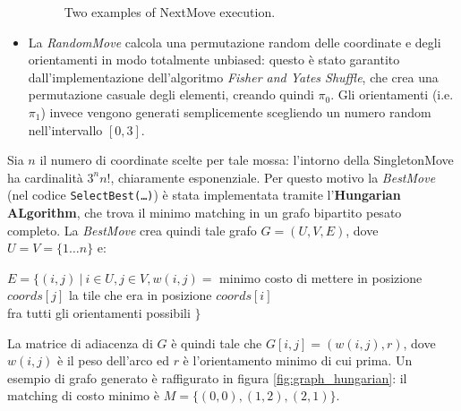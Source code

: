 \begin{itemize}
\begin{figure}[H]
            \caption{Two examples of NextMove execution.}
            \label{fig:next_example}
    	\end{figure}

    	\item La \textit{RandomMove} calcola una permutazione random delle coordinate e degli orientamenti in modo totalmente unbiased: questo è stato garantito dall'implementazione dell'algoritmo \textit{Fisher and Yates Shuffle}, che crea una permutazione casuale degli elementi, creando quindi $\pi_0$. Gli orientamenti (i.e. $\pi_1$) invece vengono generati semplicemente scegliendo un numero random nell'intervallo $[0,3]$.
    \end{itemize}


    Sia $n$ il numero di coordinate scelte per tale mossa: l'intorno della SingletonMove ha cardinalità $3^n n!$, chiaramente esponenziale. Per questo motivo la \textit{BestMove} (nel codice \texttt{SelectBest(\dots)}) è stata implementata tramite l'\textbf{Hungarian ALgorithm}, che trova il minimo matching in un grafo bipartito pesato completo. La \textit{BestMove} crea quindi tale grafo $G=(U,V,E)$, dove $U=V=\{1 \dots n\}$ e:
    \begin{center}
    $E = \{ (i,j) \ | \ i \in U , j \in V , w(i,j) = $ minimo costo di mettere in posizione $coords[j]$ la tile che era in posizione $coords[i]$ \\ fra tutti gli orientamenti possibili $\}$
    \end{center}
    La matrice di adiacenza di $G$ è quindi tale che $G[i,j] = (w(i,j),r)$, dove $w(i,j)$ è il peso dell'arco ed $r$ è l'orientamento minimo di cui prima. Un esempio di grafo generato è raffigurato in figura \ref{fig:graph_hungarian}: il matching di costo minimo è $M=\{(0,0),(1,2),(2,1)\}$. 

